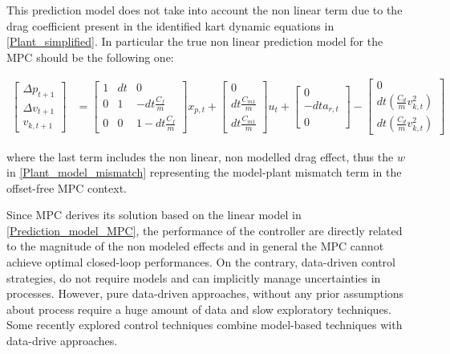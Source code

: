 \documentclass[a4paper,12pt,oneside]{book}
\begin{document}
This prediction model does not take into account the non linear term due to the drag coefficient present in the identified kart dynamic equations in \ref{Plant_simplified}.
In particular the true non linear prediction model for the MPC should be the following one:

\begin{equation}
\begin{aligned}
    \begin{bmatrix}
        \Delta p_{t+1}  \\
        \Delta v_{t+1} \\
        v_{k,t+1}
    \end{bmatrix}
    & =
    \begin{bmatrix}
        1 & dt & 0 \\
        0 & 1 & -dt\frac{C_f}{m} \\
        0 & 0 & 1-dt\frac{C_f}{m}
    \end{bmatrix}
    x_{p,t}
    +
    \begin{bmatrix}
        0 \\
        dt \frac{C_{m1}}{m} \\
        dt \frac{C_{m1}}{m}
    \end{bmatrix}
    u_t + 
    \begin{bmatrix}
    0 \\
    - dt a_{r,t} \\
    0
    \end{bmatrix} 
    -
    \begin{bmatrix}
    0 \\
    dt (\frac{C_{d}}{m} v_{k,t}^2) \\
    dt (\frac{C_{d}}{m} v_{k,t}^2)
    \end{bmatrix}
\end{aligned}
\label{Non-lin_prediction_model_MPC}
\end{equation}

where the last term includes the non linear, non modelled drag effect, thus the $w$ in \ref{Plant_model_mismatch} representing the model-plant mismatch term in the offset-free MPC context.

\bigskip
Since MPC derives its solution based on the linear model in \ref{Prediction_model_MPC}, the performance of the controller are directly related to the magnitude of the non modeled effects and in general the MPC cannot achieve optimal closed-loop performances.
On the contrary, data-driven control strategies, do not require models and can implicitly manage uncertainties in processes. However, pure data-driven approaches, without any prior assumptions about process require a huge amount of data and slow exploratory techniques.
Some recently explored control techniques combine model-based techniques with data-drive approaches. 
\end{document}
